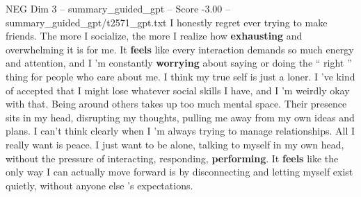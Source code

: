 \begin{textsample}{NEG Dim 3 – summary\_guided\_gpt – Score -3.00 – summary\_guided\_gpt/t2571\_gpt.txt}  \label{ex:f3_neg_027}
I honestly regret ever trying to make friends.
The more I socialize, the more I realize how \textbf{exhausting} and overwhelming it is for me.
It \textbf{feels} like every interaction demands so much energy and attention, and I ’m constantly \textbf{worrying} about saying or doing the “ right ” thing for people who care about me.
I think my true self is just a loner.
I ’ve kind of accepted that I might lose whatever social skills I have, and I ’m weirdly okay with that.
Being around others takes up too much mental space.
Their presence sits in my head, disrupting my thoughts, pulling me away from my own ideas and plans.
I can't think clearly when I ’m always trying to manage relationships.
All I really want is peace.
I just want to be alone, talking to myself in my own head, without the pressure of interacting, responding, \textbf{performing}.
It \textbf{feels} like the only way I can actually move forward is by disconnecting and letting myself exist quietly, without anyone else ’s expectations.

\end{textsample}
